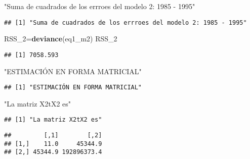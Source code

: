 \documentclass[
]{article}
\newenvironment{Shaded}{\begin{snugshade}}{\end{snugshade}}
\newcommand{\DataTypeTok}[1]{\textcolor[rgb]{0.13,0.29,0.53}{#1}}
\newcommand{\DecValTok}[1]{\textcolor[rgb]{0.00,0.00,0.81}{#1}}
\newcommand{\KeywordTok}[1]{\textcolor[rgb]{0.13,0.29,0.53}{\textbf{#1}}}
\newcommand{\NormalTok}[1]{#1}
\newcommand{\OperatorTok}[1]{\textcolor[rgb]{0.81,0.36,0.00}{\textbf{#1}}}
\newcommand{\StringTok}[1]{\textcolor[rgb]{0.31,0.60,0.02}{#1}}
\begin{document}
\begin{Shaded}
\begin{Highlighting}[]
\StringTok{"Suma de cuadrados de los errroes del modelo 2: 1985 - 1995"}
\end{Highlighting}
\end{Shaded}

\begin{verbatim}
## [1] "Suma de cuadrados de los errroes del modelo 2: 1985 - 1995"
\end{verbatim}

\begin{Shaded}
\begin{Highlighting}[]
\NormalTok{RSS_}\DecValTok{2}\NormalTok{=}\KeywordTok{deviance}\NormalTok{(eq1_m2)}
\NormalTok{RSS_}\DecValTok{2}
\end{Highlighting}
\end{Shaded}

\begin{verbatim}
## [1] 7058.593
\end{verbatim}

\begin{Shaded}
\begin{Highlighting}[]
\StringTok{"ESTIMACIÓN EN FORMA MATRICIAL"}
\end{Highlighting}
\end{Shaded}

\begin{verbatim}
## [1] "ESTIMACIÓN EN FORMA MATRICIAL"
\end{verbatim}

\begin{Shaded}
\begin{Highlighting}[]
\StringTok{"La matriz X2tX2 es"}
\end{Highlighting}
\end{Shaded}

\begin{verbatim}
## [1] "La matriz X2tX2 es"
\end{verbatim}

\begin{Shaded}
\end{Shaded}

\begin{verbatim}
##         [,1]        [,2]
## [1,]    11.0     45344.9
## [2,] 45344.9 192896373.4
\end{verbatim}
\end{document}
